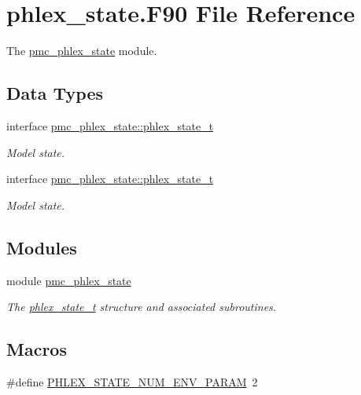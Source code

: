 \hypertarget{phlex__state_8_f90}{}\section{phlex\+\_\+state.\+F90 File Reference}
\label{phlex__state_8_f90}


The \mbox{\hyperlink{namespacepmc__phlex__state}{pmc\+\_\+phlex\+\_\+state}} module.  


\subsection*{Data Types}
\begin{DoxyCompactItemize}
\item 
interface \mbox{\hyperlink{structpmc__phlex__state_1_1phlex__state__t}{pmc\+\_\+phlex\+\_\+state\+::phlex\+\_\+state\+\_\+t}}
\begin{DoxyCompactList}\small\item\em Model state. \end{DoxyCompactList}\item 
interface \mbox{\hyperlink{structpmc__phlex__state_1_1phlex__state__t}{pmc\+\_\+phlex\+\_\+state\+::phlex\+\_\+state\+\_\+t}}
\begin{DoxyCompactList}\small\item\em Model state. \end{DoxyCompactList}\end{DoxyCompactItemize}
\subsection*{Modules}
\begin{DoxyCompactItemize}
\item 
module \mbox{\hyperlink{namespacepmc__phlex__state}{pmc\+\_\+phlex\+\_\+state}}
\begin{DoxyCompactList}\small\item\em The \mbox{\hyperlink{structpmc__phlex__state_1_1phlex__state__t}{phlex\+\_\+state\+\_\+t}} structure and associated subroutines. \end{DoxyCompactList}\end{DoxyCompactItemize}
\subsection*{Macros}
\begin{DoxyCompactItemize}
\item 
\#define \mbox{\hyperlink{phlex__state_8_f90_a6cf7eb4806e31aff84f46b1f83307bde}{P\+H\+L\+E\+X\+\_\+\+S\+T\+A\+T\+E\+\_\+\+N\+U\+M\+\_\+\+E\+N\+V\+\_\+\+P\+A\+R\+AM}}~2
\end{DoxyCompactItemize}
